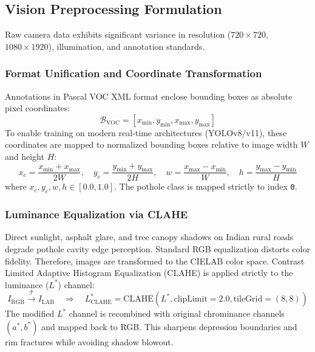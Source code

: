 \documentclass[11pt,a4paper]{article}
\begin{document}
\subsection{Vision Preprocessing Formulation}
Raw camera data exhibits significant variance in resolution ($720\times720$, $1080\times1920$), illumination, and annotation standards.

\subsubsection{Format Unification and Coordinate Transformation}
Annotations in Pascal VOC XML format enclose bounding boxes as absolute pixel coordinates:
\begin{equation}
\mathcal{B}_{\text{VOC}} = [x_{\min}, y_{\min}, x_{\max}, y_{\max}]
\end{equation}
To enable training on modern real-time architectures (YOLOv8/v11), these coordinates are mapped to normalized bounding boxes relative to image width $W$ and height $H$:
\begin{equation}
x_c = \frac{x_{\min} + x_{\max}}{2W}, \quad y_c = \frac{y_{\min} + y_{\max}}{2H}, \quad w = \frac{x_{\max} - x_{\min}}{W}, \quad h = \frac{y_{\max} - y_{\min}}{H}
\end{equation}
where $x_c, y_c, w, h \in [0.0, 1.0]$. The pothole class is mapped strictly to index \texttt{0}.

\subsubsection{Luminance Equalization via CLAHE}
Direct sunlight, asphalt glare, and tree canopy shadows on Indian rural roads degrade pothole cavity edge perception. Standard RGB equalization distorts color fidelity. Therefore, images are transformed to the CIELAB color space. Contrast Limited Adaptive Histogram Equalization (CLAHE) is applied strictly to the luminance ($L^*$) channel:
\begin{equation}
I_{\text{RGB}} \xrightarrow{\mathcal{T}} I_{\text{LAB}} \quad \Longrightarrow \quad L^*_{\text{CLAHE}} = \text{CLAHE}(L^*, \text{clipLimit}=2.0, \text{tileGrid}=(8,8))
\end{equation}
The modified $L^*$ channel is recombined with original chrominance channels $(a^*, b^*)$ and mapped back to RGB. This sharpens depression boundaries and rim fractures while avoiding shadow blowout.
\end{document}
